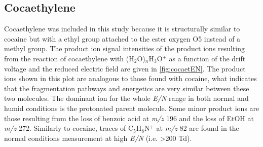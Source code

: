

\subsection{Cocaethylene}
Cocaethylene was included in this study because it is structurally similar to cocaine but with a ethyl group attached to the ester oxygen O5 instead of a methyl group.
%
The product ion signal intensities of the product ions resulting from the reaction of cocaethylene with (H$_2$O)$_n$H$_3$O$^+$ as a function of the drift voltage and the reduced electric field are given in \autoref{fig:cocaetEN}.
%
The product ions shown in this plot are analogous to those found with cocaine, what indicates that the fragmentation pathways and energetics are very similar between these two molecules.
%
The dominant ion for the whole \textit{E/N} range in both normal and humid conditions is the protonated parent molecule.
%
Some minor product ions are those resulting from 
the loss of benzoic acid at \textit{m/z} 196 and 
the loss of EtOH at \textit{m/z} 272.
%
Similarly to cocaine, traces of C$_5$H$_8$N$^+$ at \textit{m/z} 82 are found in the normal conditions measurement at high \textit{E/N} (i.e. >200 Td).

